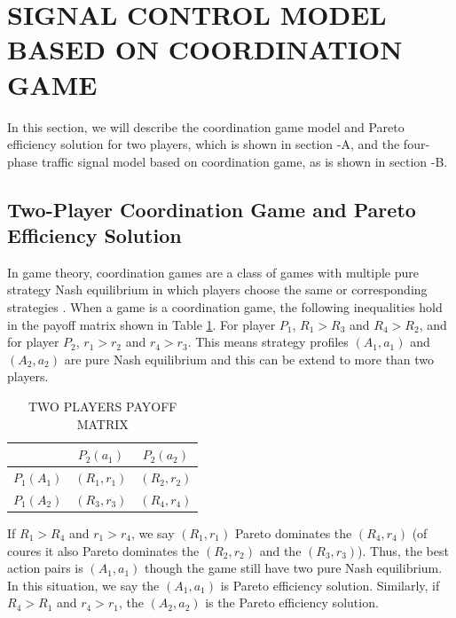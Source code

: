 \documentclass[a4paper, 10pt, conference]{ieeeconf}      %
\begin{document}
\section{SIGNAL CONTROL MODEL BASED ON COORDINATION GAME}

In this section, we will describe the coordination game model and Pareto efficiency solution for two players, which is shown in section 
\uppercase\expandafter{}-A, and the four-phase traffic signal model based on coordination game, as is shown in section 
\uppercase\expandafter{}-B. 

\subsection{Two-Player Coordination Game and Pareto Efficiency Solution}
In game theory, coordination games are a class of games with multiple pure strategy Nash equilibrium in which players choose the same or corresponding 
strategies \cite{osborne1994course}. When a game is a coordination game, the following inequalities hold in the payoff matrix shown in Table 
\ref{Tab:PayMatrix}. For player $P_1$, $R_1>R_3$ and $R_4>R_2$, and for player $P_2$, $r_1>r_2$ and $r_4>r_3$. This means strategy profiles $(A_1, a_1)$
and $(A_2,a_2)$ are pure Nash equilibrium and this can be extend to more than two players. 

\begin{table}[h]
        \caption{TWO PLAYERS PAYOFF MATRIX}
        \label{Tab:PayMatrix}
        \begin{center}
                \begin{tabular}{|c|c|c|}
                        \hline
                        &$P_2(a_1)$&$P_2(a_2)$\\
                        \hline
                        $P_1(A_1)$&$(R_1,r_1)$&$(R_2,r_2)$\\
                        \hline
                        $P_1(A_2)$&$(R_3,r_3)$&$(R_4,r_4)$\\
                        \hline
                \end{tabular}
        \end{center}
\end{table}

If $R_1>R_4$ and $r_1>r_4$, we say $(R_1,r_1)$ Pareto dominates the $(R_4,r_4)$ (of coures it also Pareto dominates the $(R_2,r_2)$ and the $(R_3,r_3)$). Thus, 
the best action pairs is $(A_1,a_1)$ though the game still have two pure Nash equilibrium. In this situation, we say the $(A_1,a_1)$ is Pareto efficiency
solution. Similarly, if $R_4>R_1$ and $r_4>r_1$, the $(A_2,a_2)$ is the Pareto efficiency solution. 
\end{document}

